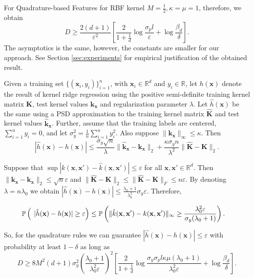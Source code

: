 For Quadrature-based Features for RBF kernel $M = \frac12, \kappa = \mu = 1$, therefore, we obtain
\[
D \geq \frac{2(d + 1)}{\varepsilon^2} \left [
\frac{2}{1 + \frac{1}{d}}\log \frac{\sigma_p l}{\varepsilon} + \log \frac{\beta_d}{\delta}
\right ] .
\]
The asymptotics is the same, however, the constants are smaller for our approach. See Section \ref{sec:experiments} for empirical justification of the obtained result.

\begin{proposition}
Given a training set $\{(\mathbf{x}_i, y_i)\}_{i = 1}^n$, with $\mathbf{x}_i \in \mathbb{R}^d$ and $y_i \in \mathbb{R}$,
let $h(\mathbf{x})$ denote the result of kernel ridge regression using the positive semi-definite training kernel matrix $\mathbf{K}$, test kernel values $\mathbf{k}_\mathbf{x}$
and regularization parameter $\lambda$.
Let $\hat{h}(\mathbf{x})$ be the same using a PSD approximation to the training kernel matrix $\widehat{\mathbf{K}}$ and test kernel values $\hat{\mathbf{k}}_\mathbf{x}$.
Further, assume that the training labels are centered, $\sum_{i = 1}^n y_i = 0$, and let $\sigma_y^2 = \frac{1}{n} \sum_{i = 1}^n y_i^2$. Also suppose $\|\mathbf{k}_\mathbf{x}\|_{\infty} \leq \kappa$.
Then
\[
|\hat{h}(\mathbf{x}) - h(\mathbf{x})| \leq \frac{\sigma_y\sqrt{n}}{\lambda} \|\hat{\mathbf{k}}_\mathbf{x} - \mathbf{k}_\mathbf{x}\|_2 + 
\frac{\kappa\sigma_yn}{\lambda^2} \|\widehat{\mathbf{K}} - \mathbf{K}\|_2.
\]
\end{proposition}

Suppose that $\sup |k(\mathbf{x}, \mathbf{x'}) - \hat{k}(\mathbf{x}, \mathbf{x'})| \leq \varepsilon$ for all $\mathbf{x}, \mathbf{x'} \in \mathbb{R}^d$.
Then $\|\hat{\mathbf{k}}_\mathbf{x} - \mathbf{k}_\mathbf{x}\|_2 \leq \sqrt{n}\varepsilon$ and
$\|\widehat{\mathbf{K}} - \mathbf{K}\|_2 \leq \|\widehat{\mathbf{K}} - \mathbf{K}\|_F \leq n\varepsilon$.
By denoting $\lambda = n \lambda_0$ we obtain $
|\hat{h}(\mathbf{x}) - h(\mathbf{x})| \leq 
\frac{\lambda_0 + 1}{\lambda_0^2} \sigma_y \varepsilon.
$
Therefore,

\begin{align*}
\mathbb{P} \left (\vphantom{|\hat{h}(x)} \right .&
\left . |\hat{h}(\mathbf{x}) - h(\mathbf{x})| \geq \varepsilon \right ) \leq
\mathbb{P} \left (
\|\hat{k}(\mathbf{x}, \mathbf{x'}) - k(\mathbf{x}, \mathbf{x}')\|_{\infty} \geq \frac{\lambda_0^2 \varepsilon}{\sigma_y(\lambda_0 + 1)}
\right ).
\end{align*}

So, for the quadrature rules we can guarantee $|\hat{h}(\mathbf{x}) - h(\mathbf{x})| \leq \varepsilon$ with probability at least $1 - \delta$ as long as
\[
D \geq 8M^2(d + 1)\sigma_y^2 \left ( \frac{\lambda_0 + 1}{\lambda_0^2 \varepsilon} \right )^2  \left [
\frac{2}{1 + \frac{1}{d}}\log \frac{\sigma_y \sigma_p l \kappa \mu(\lambda_0 + 1)}{\lambda_0^2 \varepsilon} +
\log \frac{\beta_d}{\delta}
\right ].
\]

